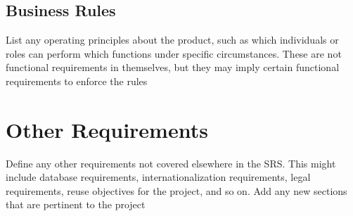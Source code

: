 \documentclass{scrreprt}
\begin{document}
    \section{Business Rules} 
    List any operating principles about the product, such as which individuals or roles can perform which functions under specific circumstances. These are not functional requirements in themselves, but they may imply certain functional requirements to enforce the rules

    \chapter{Other Requirements}
    Define any other requirements not covered elsewhere in the SRS. This might include database requirements, internationalization requirements, legal requirements, reuse objectives for the project, and so on. Add any new sections that are pertinent to the project


    
\end{document}
